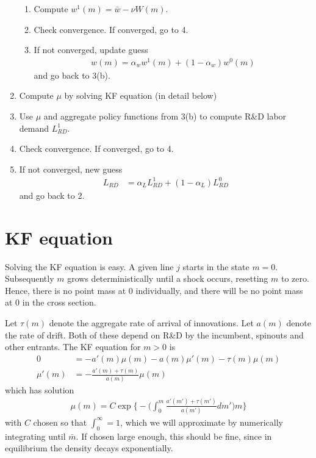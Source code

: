 \documentclass[12pt,english]{article}
\theoremstyle{remark}
\begin{document}
\begin{enumerate}
\begin{enumerate}
		\item Compute $w^1(m) =  \bar{w} - \nu W(m)$.
		\item Check convergence. If converged, go to 4. 
		\item If not converged, update guess 
		\begin{align*}
			w(m) = \alpha_w w^1(m) + (1-\alpha_w) w^0 (m) 
		\end{align*} 
		and go back to 3(b).
	\end{enumerate}
	\item Compute $\mu$ by solving KF equation (in detail below) 
	\item Use $\mu$ and aggregate policy functions from 3(b) to compute R\&D labor demand $L^1_{RD}$.
	\item Check convergence. If converged, go to 4. 
	\item If not converged, new guess
	\begin{align*}
	L_{RD} &= \alpha_L L^1_{RD} + (1-\alpha_L) L^0_{RD} 
	\end{align*}
	and go back to 2. 
\end{enumerate}

\section{KF equation}

Solving the KF equation is easy. A given line $j$ starts in the state $m = 0$. Subsequently $m$ grows deterministically until a shock occurs, resetting $m$ to zero. Hence, there is no point mass at 0 individually, and there will be no point mass at 0 in the cross section. 

Let $\tau(m)$ denote the aggregate rate of arrival of innovations. Let $a(m)$ denote the rate of drift. Both of these depend on R\&D by the incumbent, spinouts and other entrants. The KF equation for $m > 0$ is 
\begin{align*}
	0 &= -a'(m)\mu(m) - a(m)\mu'(m) - \tau(m)\mu(m) \\
	\mu'(m) &= -\frac{a'(m) + \tau(m)}{a(m)} \mu(m)
\end{align*}
which has solution 
\begin{align*}
	\mu(m) = C\exp \Bigg\{ - \Big(\int_0^m \frac{a'(m') + \tau(m')}{a(m')} dm'     \Big) m \Bigg\}
\end{align*}
with $C$ chosen so that $\int_0^{\infty} = 1$, which we will approximate by numerically integrating until $\bar{m}$. If chosen large enough, this should be fine, since in equilibrium the density decays exponentially. 
\end{document}
